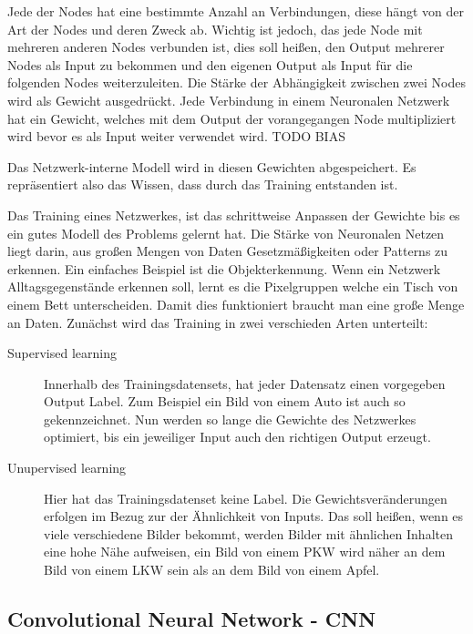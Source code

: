 \documentclass[pdftex,a4paper,halfparskip]{scrartcl}
\begin{document}
Jede der Nodes hat eine bestimmte Anzahl an Verbindungen, diese hängt von der Art der Nodes und deren Zweck ab. Wichtig ist jedoch, das jede Node mit mehreren anderen Nodes verbunden ist, dies soll heißen, den Output mehrerer Nodes als Input zu bekommen und den eigenen Output als Input für die folgenden Nodes weiterzuleiten. Die Stärke der Abhängigkeit zwischen zwei Nodes wird als Gewicht ausgedrückt. Jede Verbindung in einem Neuronalen Netzwerk hat ein Gewicht, welches mit dem Output der vorangegangen Node multipliziert wird bevor es als Input weiter verwendet wird. TODO BIAS

Das Netzwerk-interne Modell wird in diesen Gewichten abgespeichert. Es repräsentiert also das Wissen, dass durch das Training entstanden ist.

Das Training eines Netzwerkes, ist das schrittweise Anpassen der Gewichte bis es ein gutes Modell des Problems gelernt hat. Die Stärke von Neuronalen Netzen liegt darin, aus großen Mengen von Daten Gesetzmäßigkeiten oder Patterns zu erkennen. Ein einfaches Beispiel ist die Objekterkennung. Wenn ein Netzwerk Alltagsgegenstände erkennen soll, lernt es die Pixelgruppen welche ein Tisch von einem Bett unterscheiden. Damit dies funktioniert braucht man eine große Menge an Daten. Zunächst wird das Training in zwei verschieden Arten unterteilt: 

\begin{description}
	\item[Supervised learning] Innerhalb des Trainingsdatensets, hat jeder Datensatz einen vorgegeben Output Label. Zum Beispiel ein Bild von einem Auto ist auch so gekennzeichnet. Nun werden so lange die Gewichte des Netzwerkes optimiert, bis ein jeweiliger Input auch den richtigen Output erzeugt.
	\item[Unupervised learning] Hier hat das Trainingsdatenset keine Label. Die Gewichtsveränderungen erfolgen im Bezug zur der Ähnlichkeit von Inputs. Das soll heißen, wenn es viele verschiedene Bilder bekommt, werden Bilder mit ähnlichen Inhalten eine hohe Nähe aufweisen, ein Bild von einem PKW wird näher an dem Bild von einem LKW sein als an dem Bild von einem Apfel.
\end{description}

\subsection{Convolutional Neural Network - CNN}
\end{document}
